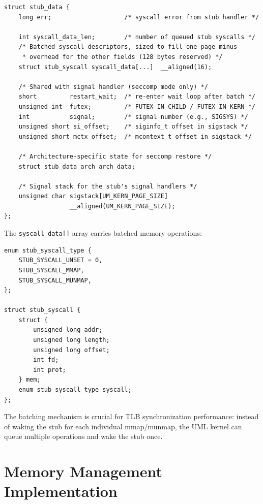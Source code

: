 \begin{lstlisting}[language=KernelC,caption={The \texttt{stub\_data} structure},label=lst:stub-data-impl]
struct stub_data {
    long err;                    /* syscall error from stub handler */

    int syscall_data_len;        /* number of queued stub syscalls */
    /* Batched syscall descriptors, sized to fill one page minus
     * overhead for the other fields (128 bytes reserved) */
    struct stub_syscall syscall_data[...]  __aligned(16);

    /* Shared with signal handler (seccomp mode only) */
    short         restart_wait;  /* re-enter wait loop after batch */
    unsigned int  futex;         /* FUTEX_IN_CHILD / FUTEX_IN_KERN */
    int           signal;        /* signal number (e.g., SIGSYS) */
    unsigned short si_offset;    /* siginfo_t offset in sigstack */
    unsigned short mctx_offset;  /* mcontext_t offset in sigstack */

    /* Architecture-specific state for seccomp restore */
    struct stub_data_arch arch_data;

    /* Signal stack for the stub's signal handlers */
    unsigned char sigstack[UM_KERN_PAGE_SIZE]
                  __aligned(UM_KERN_PAGE_SIZE);
};
\end{lstlisting}

The \texttt{syscall\_data[]} array carries batched memory operations:

\begin{lstlisting}[language=KernelC,caption={Stub syscall descriptor},label=lst:stub-syscall]
enum stub_syscall_type {
    STUB_SYSCALL_UNSET = 0,
    STUB_SYSCALL_MMAP,
    STUB_SYSCALL_MUNMAP,
};

struct stub_syscall {
    struct {
        unsigned long addr;
        unsigned long length;
        unsigned long offset;
        int fd;
        int prot;
    } mem;
    enum stub_syscall_type syscall;
};
\end{lstlisting}

The batching mechanism is crucial for TLB synchronization performance: instead
of waking the stub for each individual mmap/munmap, the UML kernel can queue
multiple operations and wake the stub once.

\section{Memory Management Implementation}
\label{sec:impl-memory}

